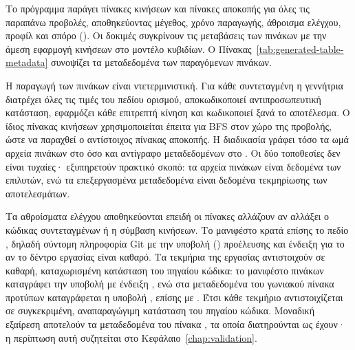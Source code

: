 Το πρόγραμμα  παράγει πίνακες κινήσεων και πίνακες αποκοπής για όλες τις παραπάνω προβολές, αποθηκεύοντας μέγεθος, χρόνο παραγωγής, άθροισμα ελέγχου, προφίλ και σπόρο (). Οι δοκιμές συγκρίνουν τις μεταβάσεις των πινάκων με την άμεση εφαρμογή κινήσεων στο μοντέλο κυβιδίων. Ο Πίνακας~\ref{tab:generated-table-metadata} συνοψίζει τα μεταδεδομένα των παραγόμενων πινάκων.

\begin{table}[htbp]\centering

\caption{Μεταδεδομένα των παραγόμενων πινάκων κινήσεων και αποκοπής ανά συντεταγμένη: μέγεθος πεδίου τιμών, πλήθος εγγραφών και πλήθος επιτρεπτών κινήσεων, όπως καταγράφονται στο μανιφέστο () .}
\label{tab:generated-table-metadata}
\end{table}

Η παραγωγή των πινάκων είναι ντετερμινιστική. Για κάθε συντεταγμένη η γεννήτρια διατρέχει όλες τις τιμές του πεδίου ορισμού, αποκωδικοποιεί αντιπροσωπευτική κατάσταση, εφαρμόζει κάθε επιτρεπτή κίνηση και κωδικοποιεί ξανά το αποτέλεσμα. Ο ίδιος πίνακας κινήσεων χρησιμοποιείται έπειτα για BFS στον χώρο της προβολής, ώστε να παραχθεί ο αντίστοιχος πίνακας αποκοπής. Η διαδικασία γράφει τόσο τα ωμά αρχεία πινάκων στο  όσο και αντίγραφο μεταδεδομένων στο . Οι δύο τοποθεσίες δεν είναι τυχαίες· εξυπηρετούν πρακτικό σκοπό: τα αρχεία πινάκων είναι δεδομένα των επιλυτών, ενώ τα επεξεργασμένα μεταδεδομένα είναι δεδομένα τεκμηρίωσης των αποτελεσμάτων.

Τα αθροίσματα ελέγχου αποθηκεύονται επειδή οι πίνακες αλλάζουν αν αλλάξει ο κώδικας συντεταγμένων ή η σύμβαση κινήσεων. Το μανιφέστο κρατά επίσης το πεδίο , δηλαδή σύντομη πληροφορία Git με την υποβολή () προέλευσης και ένδειξη για το αν το δέντρο εργασίας είναι καθαρό. Τα τεκμήρια της εργασίας αντιστοιχούν σε καθαρή, καταχωρισμένη κατάσταση του πηγαίου κώδικα: το μανιφέστο πινάκων καταγράφει την υποβολή  με ένδειξη , ενώ στα μεταδεδομένα του γωνιακού πίνακα προτύπων καταγράφεται η υποβολή , επίσης με . Έτσι κάθε τεκμήριο αντιστοιχίζεται σε συγκεκριμένη, αναπαραγώγιμη κατάσταση του πηγαίου κώδικα. Μοναδική εξαίρεση αποτελούν τα μεταδεδομένα του πίνακα , τα οποία διατηρούνται ως έχουν· η περίπτωση αυτή συζητείται στο Κεφάλαιο~\ref{chap:validation}.

